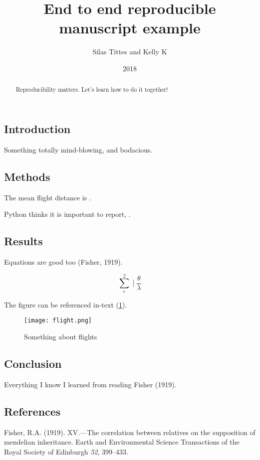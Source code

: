 \documentclass[12pt,a4paper,]{article}
\title{End to end reproducible manuscript example}
\author{Silas Tittes and Kelly K}
\date{2018}
\begin{document}
\maketitle
\begin{abstract}
Reproducibility matters. Let's learn how to do it together!
\end{abstract}

\subsection{Introduction}\label{introduction}

Something totally mind-blowing, and bodacious.

\subsection{Methods}\label{methods}

The mean flight distance is \meandistance{}.

\noindent
Python thinks it is important to report, \pyvar{}.

\subsection{Results}\label{results}

Equations are good too (Fisher, 1919).

\[\sum_{e}^{2} \mid \frac{\theta}{\lambda}\]

The figure can be referenced in-text (\ref{fig:flight}).

\begin{figure}
\centering
\texttt{[image: flight.png]}
\caption{Something about flights\label{fig:flight}}
\end{figure}

\subsection{Conclusion}\label{conclusion}

Everything I know I learned from reading Fisher (1919).

\subsection*{References}\label{references}

\hypertarget{refs}{}
\hypertarget{ref-fisher1919xv}{}
Fisher, R.A. (1919). XV.---The correlation between relatives on the
supposition of mendelian inheritance. Earth and Environmental Science
Transactions of the Royal Society of Edinburgh \emph{52}, 399--433.
\end{document}
